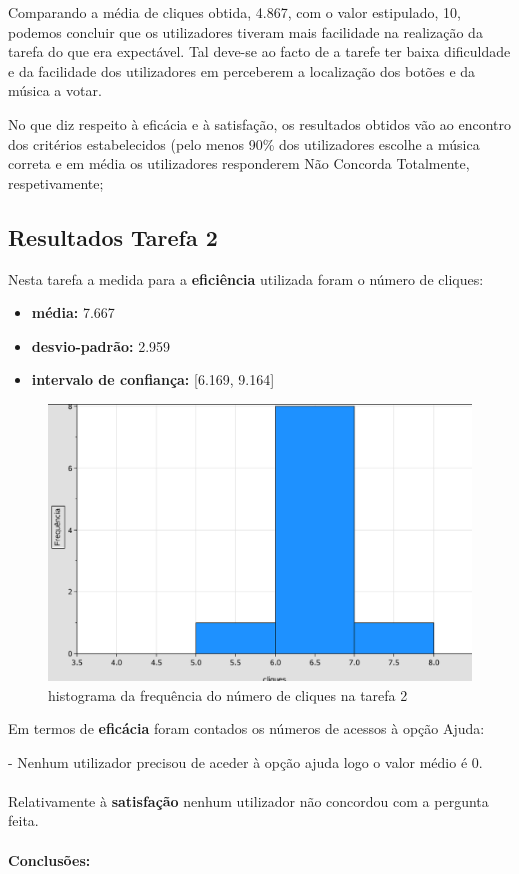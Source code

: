 \documentclass{article}
\begin{document}
Comparando a média de cliques obtida, 4.867, com o valor estipulado, 10, podemos concluir que os utilizadores tiveram mais facilidade na realização da tarefa do que era expectável. Tal deve-se ao facto de a tarefe ter baixa dificuldade e da facilidade dos utilizadores em perceberem a localização dos botões e da música a votar.

 No que diz respeito à eficácia e à satisfação, os resultados obtidos vão ao encontro dos critérios estabelecidos (pelo menos 90\% dos utilizadores escolhe a música correta e em média os utilizadores responderem Não Concorda Totalmente, respetivamente; 

\subsection*{Resultados Tarefa 2}
Nesta tarefa a medida para a \textbf{eficiência} utilizada foram o número de cliques:
\begin{itemize}
\item\textbf{média:} 7.667
\item\textbf{desvio-padrão:} 2.959
\item\textbf{intervalo de confiança:} [6.169, 9.164]
\end{itemize}
\begin{figure}[h]
\centering
\includegraphics[scale=0.35]{grafico2}
\caption{histograma da frequência do número de cliques na tarefa 2}
\end{figure} Em termos de \textbf{eficácia} foram contados os números de acessos à opção Ajuda:

 - Nenhum utilizador precisou de aceder à opção ajuda logo o valor médio é 0.\\\\
Relativamente à \textbf{satisfação} nenhum utilizador não concordou com a pergunta feita.\\\\
\textbf{Conclusões:}
\end{document}
